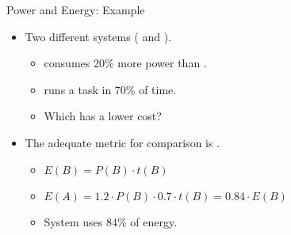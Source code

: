 \begin{frame}[t]{Power and Energy: Example}
\begin{itemize}
  \item Two different systems ( and ).
    \begin{itemize}
      \item {} consumes 20\% more power than .
      \item {} runs a task in 70\% of  time.
      \item Which has a lower cost?
    \end{itemize}

  \item The adequate metric for comparison is .
    \begin{itemize}
      \item $E(B) = P(B) \cdot t(B)$
      \item $E(A) = 1.2 \cdot P(B) \cdot 0.7 \cdot t(B) = 0.84 \cdot E(B)$
      \item System  uses 84\% of  energy.
    \end{itemize}
\end{itemize}
\end{frame}

